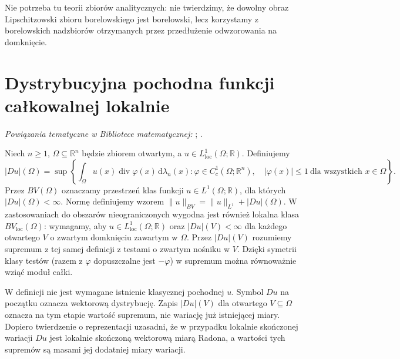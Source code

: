 Nie potrzeba tu teorii zbiorów analitycznych:
nie twierdzimy, że dowolny obraz Lipschitzowski
zbioru borelowskiego jest borelowski, lecz korzystamy
z borelowskich nadzbiorów otrzymanych przez
przedłużenie odwzorowania na domknięcie.

\section{Dystrybucyjna pochodna funkcji całkowalnej lokalnie}

\noindent\emph{Powiązania tematyczne w Bibliotece matematycznej:} ; .

\begin{definicja}
\label{def:BV-variation-29}
Niech $n\ge1$, $\Omega\subseteq\mathbb R^n$ będzie
zbiorem otwartym, a $u\in L^1_{\mathrm{loc}}(\Omega;\mathbb R)$.
Definiujemy
\[
 |Du|(\Omega)=\sup\left\{
 \int_\Omega u(x)\operatorname{div}\varphi(x)
   \,\mathrm d\lambda_n(x):
 \varphi\in C_c^1(\Omega;\mathbb R^n),\quad
 |\varphi(x)|\le1\ \text{dla wszystkich }x\in\Omega
 \right\}.
\]
Przez $BV(\Omega)$ oznaczamy przestrzeń
klas funkcji $u\in L^1(\Omega;\mathbb R)$, dla których
$|Du|(\Omega)<\infty$. Normę definiujemy wzorem
$\|u\|_{BV}=\|u\|_{L^1}+|Du|(\Omega)$.
W zastosowaniach do obszarów nieograniczonych
wygodna jest również lokalna klasa $BV_{\mathrm{loc}}(\Omega)$:
wymagamy, aby $u\in L^1_{\mathrm{loc}}(\Omega;\mathbb R)$
oraz $|Du|(V)<\infty$ dla każdego otwartego
$V$ o zwartym domknięciu zawartym w $\Omega$.
Przez $|Du|(V)$ rozumiemy supremum z tej samej
definicji z testami o zwartym nośniku w $V$.
Dzięki symetrii klasy testów (razem z $\varphi$
dopuszczalne jest $-\varphi$) w supremum można
równoważnie wziąć moduł całki.
\end{definicja}

W definicji nie jest wymagane istnienie klasycznej
pochodnej $u$. Symbol $Du$ na początku oznacza
wektorową dystrybucję. Zapis $|Du|(V)$ dla
otwartego $V\subseteq\Omega$ oznacza na tym etapie
wartość supremum, nie wariację już istniejącej
miary. Dopiero twierdzenie o reprezentacji
uzasadni, że w przypadku lokalnie skończonej
wariacji $Du$ jest lokalnie skończoną wektorową
miarą Radona, a wartości tych supremów są
masami jej dodatniej miary wariacji.


